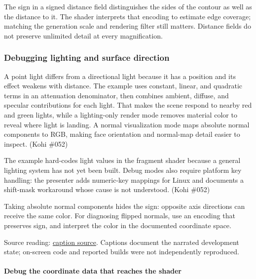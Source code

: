 The sign in a signed distance field distinguishes the sides of the contour as well as the distance to it. The shader interprets that encoding to estimate edge coverage; matching the generation scale and rendering filter still matters. Distance fields do not preserve unlimited detail at every magnification.

\subsubsection{Debugging lighting and surface direction}\label{06-engine-ii-ch026-debugging-lighting-and-surface-direction}

\hypertarget{06-engine-ii-ch026-debugging-lighting-and-surface-direction}{}

A point light differs from a directional light because it has a position and its effect weakens with distance. The example uses constant, linear, and quadratic terms in an attenuation denominator, then combines ambient, diffuse, and specular contributions for each light. That makes the scene respond to nearby red and green lights, while a lighting-only render mode removes material color to reveal where light is landing. A normal visualization mode maps absolute normal components to RGB, making face orientation and normal-map detail easier to inspect. (Kohi \#052)

The example hard-codes light values in the fragment shader because a general lighting system has not yet been built. Debug modes also require platform key handling: the presenter adds numeric-key mappings for Linux and documents a shift-mask workaround whose cause is not understood. (Kohi \#052)

Taking absolute normal components hides the sign: opposite axis directions can receive the same color. For diagnosing flipped normals, use an encoding that preserves sign, and interpret the color in the documented coordinate space.

Source reading: \href{https://www.youtube.com/watch?v=uD_vLeHvM1M}{caption source}. Captions document the narrated development state; on-screen code and reported builds were not independently reproduced.

\paragraph{Debug the coordinate data that reaches the shader}\label{06-engine-ii-ch026-debug-the-coordinate-data-that-reaches-the-shader}

\hypertarget{06-engine-ii-ch026-debug-the-coordinate-data-that-reaches-the-shader}{}

